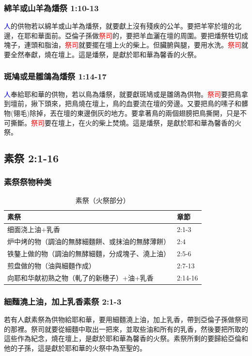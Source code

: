 \subsubsection{綿羊或山羊為燔祭 1:10-13}
\textcolor{blue}{人}的供物若以綿羊或山羊為燔祭，就要獻上沒有殘疾的公羊。要把羊宰於壇的北邊，在耶和華面前。亞倫子孫做\textcolor{red}{祭司}的，要把羊血灑在壇的周圍。要把燔祭牲切成塊子，連頭和脂油，\textcolor{red}{祭司}就要擺在壇上火的柴上。但臟腑與腿，要用水洗。\textcolor{red}{祭司}就要全然奉獻，燒在壇上。這是燔祭，是獻於耶和華為馨香的火祭。

\subsubsection{斑鳩或是雛鴿為燔祭 1:14-17}
\textcolor{blue}{人}奉給耶和華的供物，若以鳥為燔祭，就要獻斑鳩或是雛鴿為供物。\textcolor{red}{祭司}要把鳥拿到壇前，揪下頭來，把鳥燒在壇上，鳥的血要流在壇的旁邊。又要把鳥的嗉子和髒物(翎毛)除掉，丟在壇的東邊倒灰的地方。要拿著鳥的兩個翅膀把鳥撕開，只是不可撕斷。\textcolor{red}{祭司}要在壇上，在火的柴上焚燒。這是燔祭，是獻於耶和華為馨香的火祭。
   
\subsection{素祭 2:1-16}
\subsubsection{素祭祭物种类}
\noindent
\begin{table}
\centering
\begin{tabular}{l|l}\hline\hline
    素祭 & 章節   \\ \hline
细面浇上油+乳香   & 2:1-3 \\ \hline
炉中烤的物（調油的無酵細麵餅、或抹油的無酵薄餅）&2:4 \\\hline
铁鏊上做的物（調油的無酵細麵，分成塊子、澆上油）& 2:5-6 \\\hline
煎盘做的物（油與細麵作成） &2:7-13\\\hline
向耶和华献初熟之物（軋了的新穗子）+油+乳香&2:14-16\\\hline
\end{tabular}
\caption{素祭（火祭部分）}
\end{table}
 
\subsubsection{細麵澆上油，加上乳香素祭 2:1-3}
若有人獻素祭為供物給耶和華，要用細麵澆上油，加上乳香，帶到亞倫子孫做祭司的那裡。祭司就要從細麵中取出一把來，並取些油和所有的乳香，然後要把所取的這些作為紀念，燒在壇上，是獻於耶和華為馨香的火祭。素祭所剩的要歸給亞倫和他的子孫，這是獻於耶和華的火祭中為至聖的。

